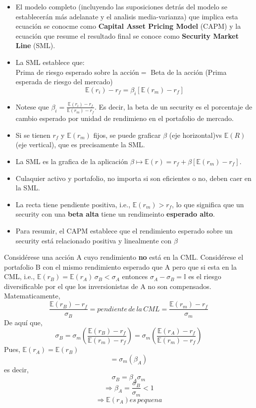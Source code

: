 \documentclass[12pts]{extarticle}
\begin{document}
\begin{itemize}
\item El modelo completo (incluyendo las suposiciones detrás del modelo se establecerán más adelanate y el analisis media-varianza) que implica esta ecuación se conocme como \textbf{Capital Asset Pricing Model} (CAPM) y la ecuación que resume el resultado final se conoce como \textbf{Security Market Line} (SML). 
\item La SML establece que: \\ Prima de riesgo esperado sobre la acción$=$ Beta de la acción (Prima esperada de riesgo del mercado) $$\mathbb{E}(r_i)-r_f=\beta_i [\mathbb{E}(r_m)-r_f]$$
\item Notese que $\beta_i=\frac{\mathbb{E}(r_i)-r_f}{\mathbb{E}(r_m)-r_f}$. Es decir, la beta de un security es el porcentaje de cambio esperado por unidad de rendimieno en el portafolio de mercado. 
\item Si se tienen $r_f$ y $\mathbb{E}(r_m)$ fijos, se puede graficar $\beta$ (eje horizontal)vs $\mathbb{E}(R)$ (eje vertical), que es precisamente la SML. 
\item La SML es la grafica de la aplicación $\beta \longmapsto \mathbb{E}(r)=r_f +\beta [\mathbb{E}(r_m)-r_f]$.
\item Culaquier activo y portafolio, no importa si son eficientes o no, deben caer en la SML. 
\item La recta tiene pendiente positiva, i.e., $\mathbb{E}(r_m)>r_f$, lo que significa que un security con una \textbf{beta alta} tiene un rendimeinto \textbf{esperado alto}. 
\item Para resumir, el CAPM establece que el rendimiento esperado sobre un security está relacionado positiva y linealmente con $\beta$ 
\end{itemize}
Considérese una acción A cuyo rendimiento \textbf{no} está en la CML. Considérese el portafolio B con el mismo rendimiento esperado que A pero que si esta en la CML, i.e., $\mathbb{E}(r_B)=\mathbb{E}(r_A) \, \sigma_B<\sigma_A$ entonces $\sigma_A-\sigma_B=\mathbb{I}$ es el riesgo diversificable por el que los inversionistas de A no son compensados. \\
Matematicamente, $$\frac{\mathbb{E}(r_B)-r_f}{\sigma_B}=pendiente\, de\, la \, CML=\frac{\mathbb{E}(r_m)-r_f}{\sigma_m}$$
De aquí que, $$\sigma_B=\sigma_m(\frac{\mathbb{E}(r_B)-r_f}{\mathbb{E}(r_m)-r_f})=\sigma_m (\frac{\mathbb{E}(r_A)-r_f}{\mathbb{E}(r_m)-r_f})$$ Pues, $\mathbb{E}(r_A)=\mathbb{E}(r_B)$ 
$$=\sigma_m(\beta_A)$$ es decir, $$\sigma_B=\beta_A \sigma_m$$
$$\Rightarrow \beta_A=\frac{\sigma_B}{\sigma_m}<1$$
$$\Rightarrow \mathbb{E}(r_A) es \, pequena$$ 
\end{document}
